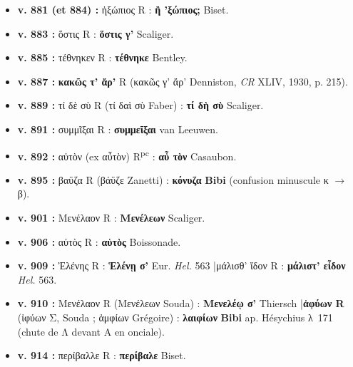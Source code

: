 \documentclass[10pt, a4paper, twoside]{book}
\renewcommand{\_}{\origunderscore\penalty0\relax}
\providecommand{\italique}[1]{\emph{#1}}
\providecommand{\lecon}[1]{\textbf{#1}}
\providecommand{\expo}[1]{\textsuperscript{#1}}
\providecommand{\Rpc}{R\expo{pc}}
\providecommand{\espApp}{\hspace{0.5em}|\hspace{0.5em}}
\begin{document}
\begin{itemize}
\begin{itemize}
    \item \textbf{v. 881 (et 884) :} ἠξώπιος R : \lecon{ἢ 'ξώπιος;} Biset.
    \item \textbf{v. 883 :} ὅστις R : \lecon{ὅστις γ'} Scaliger.
    \item \textbf{v. 885 :} τέθνηκεν R : \lecon{τέθνηκε} Bentley.
    \item \textbf{v. 887 :} \lecon{κακῶς τ' ἄρ'} R (κακῶς γ' ἄρ' Denniston, \italique{CR} XLIV, 1930, p. 215).
    \item \textbf{v. 889 :} τί δὲ σὺ R (τί δαὶ σὺ Faber) : \lecon{τί δὴ σὺ} Scaliger.
    \item \textbf{v. 891 :} συμμῖξαι R : \lecon{συμμεῖξαι} van Leeuwen.
    \item \textbf{v. 892 :} αὐτὸν (ex αὖτὸν) \Rpc{} : \lecon{αὖ τὸν} Casaubon.
    \item \textbf{v. 895 :} βαϋζα R (βάϋζε Zanetti) : \lecon{κόνυζα} \lecon{Bibi} (confusion minuscule κ $\to$ β).
    \item \textbf{v. 901 :} Μενέλαον R : \lecon{Μενέλεων} Scaliger.
    \item \textbf{v. 906 :} αὐτὸς R : \lecon{αὑτὸς} Boissonade.
    \item \textbf{v. 909 :} Ἐλένης R : \lecon{Ἑλένῃ σ'} Eur. \italique{Hel.} 563 \espApp μάλισθ' ἴδον R : \lecon{μάλιστ' εἶδον} \italique{Hel.} 563.
    \item \textbf{v. 910 :} Μενέλαον R (Μενέλεων Souda) : \lecon{Μενελέῳ σ'} Thiersch \espApp \textbf{ἀφύων R} (ἰφύων Σ, Souda ; ἀμφίων Grégoire) : \lecon{λαιφίων} \lecon{Bibi} ap. Hésychius λ~171 (chute de Λ devant Α en onciale).
    \item \textbf{v. 914 :} περίβαλλε R : \lecon{περίβαλε} Biset.
  \end{itemize}
\end{itemize}
\end{document}
